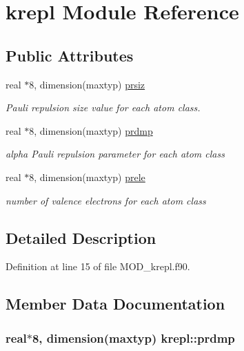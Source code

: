 \hypertarget{classkrepl}{\section{krepl Module Reference}
\label{classkrepl}
}
\subsection*{Public Attributes}
\begin{DoxyCompactItemize}
\item 
real $\ast$8, dimension(maxtyp) \hyperlink{classkrepl_a672084e82c0727951a550ebb84eb6b15}{prsiz}
\begin{DoxyCompactList}\small\item\em Pauli repulsion size value for each atom class. \end{DoxyCompactList}\item 
real $\ast$8, dimension(maxtyp) \hyperlink{classkrepl_a9bc555d6c7d01ba6f3e907f3b865e91c}{prdmp}
\begin{DoxyCompactList}\small\item\em alpha Pauli repulsion parameter for each atom class \end{DoxyCompactList}\item 
real $\ast$8, dimension(maxtyp) \hyperlink{classkrepl_ae5b8779999bbef5ba6a79cd0269c1a43}{prele}
\begin{DoxyCompactList}\small\item\em number of valence electrons for each atom class \end{DoxyCompactList}\end{DoxyCompactItemize}


\subsection{Detailed Description}


Definition at line 15 of file M\-O\-D\-\_\-krepl.\-f90.



\subsection{Member Data Documentation}
\hypertarget{classkrepl_a9bc555d6c7d01ba6f3e907f3b865e91c}{
\subsubsection[{prdmp}]{\setlength{\rightskip}{0pt plus 5cm}real$\ast$8, dimension(maxtyp) krepl\-::prdmp}}\label{classkrepl_a9bc555d6c7d01ba6f3e907f3b865e91c}


